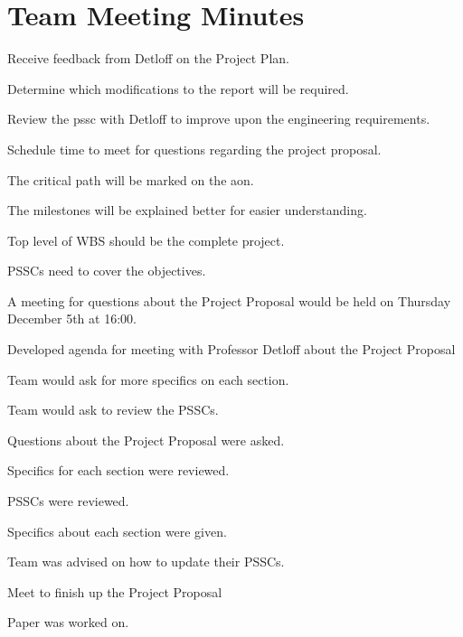 \chapter{Team Meeting Minutes}
\minutesdetails
{
	\item Receive feedback from Detloff on the Project Plan.
	\item Determine which modifications to the report will be required.
	\item Review the \gls{pssc} with Detloff to improve upon the engineering requirements.
	\item Schedule time to meet for questions regarding the project proposal.}
{
	\item The critical path will be marked on the \gls{aon}.
	\item The milestones will be explained better for easier understanding. 
	\item Top level of WBS should be the complete project.
	\item PSSCs need to cover the objectives.
	\item A meeting for questions about the Project Proposal would be held on Thursday December 5th at 16:00.
}

\minutesdetails
{
	\item Developed agenda for meeting with Professor Detloff about the Project Proposal}
{
	\item Team would ask for more specifics on each section.
	\item Team would ask to review the PSSCs.
}

\minutesdetails
{
	\item Questions about the Project Proposal were asked. 
	\item Specifics for each section were reviewed.
	\item PSSCs were reviewed.}
{
	\item Specifics about each section were given.
	\item Team was advised on how to update their PSSCs.
}

\minutesdetails
{
	\item Meet to finish up the Project Proposal}
{
	\item Paper was worked on.
}

\signatures